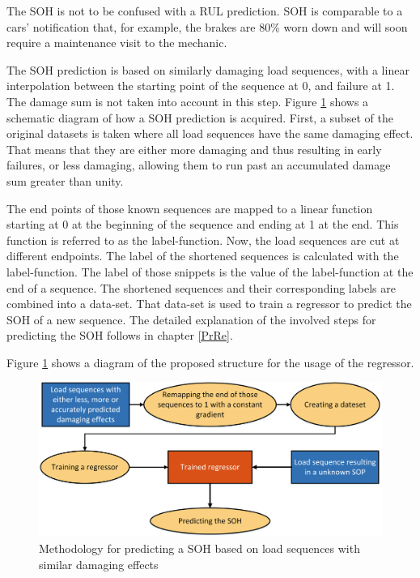 The SOH is not to be confused with a RUL prediction. SOH is comparable to a cars' notification that, for example, the brakes are 80\% worn down and will soon require a maintenance visit to the mechanic. 

The SOH prediction is based on similarly damaging load sequences, with a linear interpolation between the starting point of the sequence at 0, and failure at 1. The damage sum is not taken into account in this step. 
Figure \ref{fig:GeneralMethod2} shows a schematic diagram of how a SOH prediction is acquired.
First, a subset of the original datasets is taken where all load sequences have the same damaging effect. That means that they are either more damaging and thus resulting in early failures, or less damaging, allowing them to run past an accumulated damage sum greater than unity.\newline

The end points of those known sequences are mapped to a linear function starting at 0 at the beginning of the sequence and ending at 1 at the end. This function is referred to as the label-function. Now, the load sequences are cut at different endpoints. The label of the shortened sequences is calculated with the label-function. The label of those snippets is the value of the label-function at the end of a sequence. The shortened sequences and their corresponding labels are combined into a data-set. That data-set is used to train a regressor to predict the SOH of a new sequence. The detailed explanation of the involved steps for predicting the SOH follows in chapter \ref{PrRe}.

Figure \ref{fig:GeneralMethod2} shows a diagram of the proposed structure for the usage of the regressor. 
 
\begin{figure}[H]
	\centering
	\includegraphics[width=1\linewidth]{IMGs/Method2.png}
	\caption{Methodology for predicting a SOH based on load sequences with similar damaging effects}
	\label{fig:GeneralMethod2}
\end{figure}


